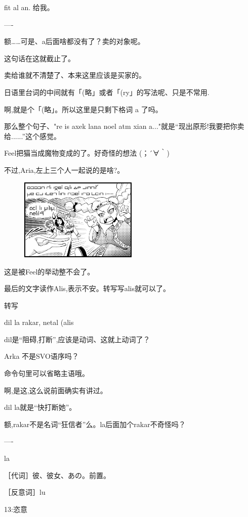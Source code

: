 fit al an. 给我。

----

额……可是、a后面啥都没有了？卖的对象呢。


这句话在这就截止了。

卖给谁就不清楚了、本来这里应该是买家的。

日语里台词的中间就有「(略」或者「(ry」的写法呢、只是不常用.


啊,就是个「(略」。所以这里是只剩下格词 a 了吗。

那么整个句子、"re is axek lana noel atm xian a..."就是``现出原形!我要把你卖给......''这个感觉。

Feel把猫当成魔物变成的了。好奇怪的想法 (；´∀｀)

不过,Aria,左上三个人一起说的是啥?。

\begin{figure}[H]
\includegraphics[width=0.5\textwidth]{ARKA/uni4.png}%
\end{figure}


这是被Feel的举动整不会了。

最后的文字读作Alis,表示不安。转写写alis就可以了。

\FiveStar 转写

dil la rakar, netal (alis


dil是``阻碍,打断'',应该是动词、这就上动词了？

Arka 不是SVO语序吗？


命令句里可以省略主语哦。


啊,是这,这么说前面确实有讲过。

dil la就是``快打断她''。

额,rakar不是名词``狂信者''么。la后面加个rakar不奇怪吗？

----

la

［代词］彼、彼女、あの。前置。

［反意词］lu

13:恣意

